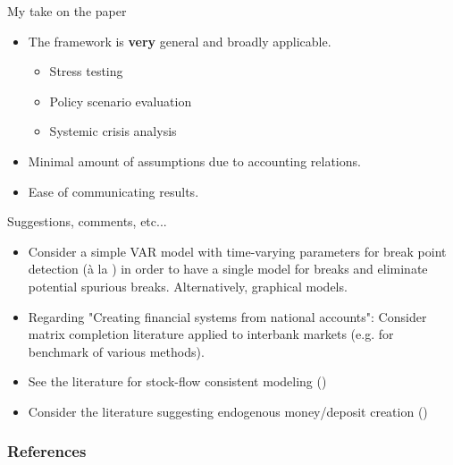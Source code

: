\documentclass{beamer}
\begin{document}
\begin{frame}{My take on the paper}
\begin{itemize}
    \item<1-> The framework is \textbf{very} general and broadly applicable. 
    \begin{itemize}
        \item<2-> Stress testing
        \item<3-> Policy scenario evaluation
        \item<4-> Systemic crisis analysis
    \end{itemize}
    \item<5-> Minimal amount of assumptions due to accounting relations.
    \item<6-> Ease of communicating results.
    
\end{itemize}
\end{frame}    

\begin{frame}{Suggestions, comments, etc...}
    \begin{itemize}
        \item<1-> Consider a simple VAR model with time-varying parameters for break point detection (à la \cite{deibold}) in order to have a single model for breaks and eliminate potential spurious breaks. Alternatively, graphical models.
        \item<2-> Regarding "Creating financial systems from national accounts": Consider matrix completion literature applied to interbank markets (e.g. \cite{anand18} for benchmark of various methods). 
        \item<3-> See the literature for stock-flow consistent modeling (\cite{godley})
        \item<4-> Consider the literature suggesting endogenous money/deposit creation (\cite{mcleay})
    \end{itemize}    
\end{frame}


\begin{frame}[allowframebreaks]
\frametitle{References}
  \printbibliography
\end{frame}
\end{document}
